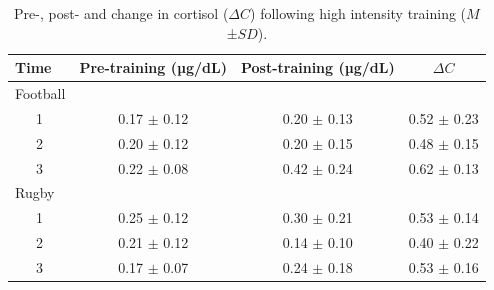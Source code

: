 \documentclass[
  english,
  man,floatsintext]{apa6}
\begin{document}
\begin{table}[H]

\begin{center}
\begin{threeparttable}

\caption{\label{tab:cortchange}Pre-, post- and change in cortisol ($\Delta C$) following high intensity training ($M$ ±$SD$).}

\begin{tabular}{lccc}
\toprule
Time & Pre-training (µg/dL) & Post-training (µg/dL) & $\Delta C$\\
\midrule
Football &  &  & \\
\ \ \ 1 & 0.17 $\pm$ 0.12 & 0.20 $\pm$ 0.13 & 0.52 $\pm$ 0.23\\
\ \ \ 2 & 0.20 $\pm$ 0.12 & 0.20 $\pm$ 0.15 & 0.48 $\pm$ 0.15\\
\ \ \ 3 & 0.22 $\pm$ 0.08 & 0.42 $\pm$ 0.24 & 0.62 $\pm$ 0.13\\
Rugby &  &  & \\
\ \ \ 1 & 0.25 $\pm$ 0.12 & 0.30 $\pm$ 0.21 & 0.53 $\pm$ 0.14\\
\ \ \ 2 & 0.21 $\pm$ 0.12 & 0.14 $\pm$ 0.10 & 0.40 $\pm$ 0.22\\
\ \ \ 3 & 0.17 $\pm$ 0.07 & 0.24 $\pm$ 0.18 & 0.53 $\pm$ 0.16\\
\bottomrule
\end{tabular}

\end{threeparttable}
\end{center}

\end{table}
\end{document}
